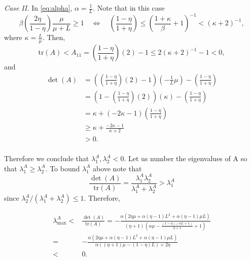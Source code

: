 \documentclass[11pt]{article}
\begin{document}
\noindent
\textit{Case II.} In \eqref{eq:alpha}, $\alpha = \frac{1}{L}$.  Note that in this case
\begin{equation}\label{eq:step}
  \beta\left(\frac{2 \eta}{1-\eta} \right)\frac{\mu}{\mu+L} \geq  1 \quad \Leftrightarrow \quad {\left(\frac{1-\eta}{1+\eta}\right)} \leq \left(\frac{1+\kappa}{\beta} + 1\right)^{-1} < \left(\kappa + 2 \right)^{-1},
\end{equation}
where $\kappa = \displaystyle\frac{L}{\mu}$.
Then,
\[
 \mbox{tr}(A) < A_{11} = {\left(\frac{1-\eta}{1+\eta}\right)}(2)-1 \leq 2\left(\kappa + 2 \right)^{-1} - 1<0,
\]
and
\begin{align*}
 \det(A) &= \left({\left(\frac{1-\eta}{1+\eta}\right)}(2)-1\right)( -\frac{1}{L}\mu ) -  {\left(\frac{1-\eta}{1+\eta}\right)}\\
         &= \left(1-{\left(\frac{1-\eta}{1+\eta}\right)}(2)\right)( \kappa) -  {\left(\frac{1-\eta}{1+\eta}\right)}\\
         &= \kappa + (-2\kappa -  1){\left(\frac{1-\eta}{1+\eta}\right)}\\
         &\geq  \kappa + \frac{-2\kappa -  1}{\kappa + 2}\\
         &> 0.\\
\end{align*}



Therefore we conclude that $\lambda^A_1,\lambda^A_2<0$.  Let us number the eigenvalues of A so that $\lambda^A_1 \geq \lambda^A_2$.
To bound  $\lambda^A_1$ above note that
\[
	\frac{\det(A)}{\mbox{tr}(A)} =\frac{ \lambda^A_1 \lambda^A_2} {\lambda^A_1 + \lambda^A_2} > \lambda^A_1
\]	
since $ \lambda^A_2 /  ( \lambda^A_1 + \lambda^A_2 )\leq 1$.
%
Therefore,

\begin{align}\label{eq:lambdaA}
 \lambda_{\max}^A < & \frac{\det(A)}{\mbox{tr}(A)} = - \frac{\alpha  \left(2 \eta  \mu +\alpha  (\eta -1) L^2+\alpha  (\eta -1) \mu  L\right)}{(\eta +1) \left(\alpha  \mu -\frac{(1-\eta ) (\alpha  L+1)}{\eta +1}+1\right)} \\
                   =& -\frac{\alpha  \left(2 \eta  \mu +\alpha  (\eta -1) L^2+\alpha  (\eta -1) \mu  L\right)}{\alpha  ((\eta +1) \mu -  (1-\eta ) L)+2 \eta } \nonumber\\
				   < & 0 .\nonumber
\end{align}
\end{document}
